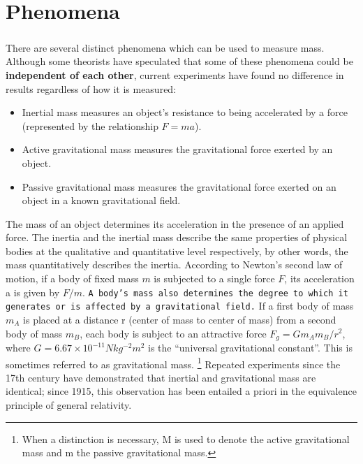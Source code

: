 \documentclass{book}
\begin{document}
	\tableofcontents
	
	
	\chapter{Phenomena}
	\setcounter{page}{1}
	
	\begin{doublespace}
		\paragraph{}
		There are several distinct phenomena which can be used to measure mass. Although some theorists have speculated that some of these phenomena could be \textbf{independent of each other}, current experiments have found no difference in results regardless of how it is measured:
		
		\begin{itemize}
			\item Inertial mass measures an object's resistance to being accelerated by a force (represented by the relationship $F = ma$).
			\item Active gravitational mass measures the gravitational force exerted by an object.
			\item Passive gravitational mass measures the gravitational force exerted on an object in a known gravitational field.
		\end{itemize}    
		
		The mass of an object determines its acceleration in the presence of an applied force. The inertia and the inertial mass describe the same properties of physical bodies at the qualitative and quantitative level respectively, by other words, the mass quantitatively describes the inertia. According to Newton's second law of motion, if a body of fixed mass $m$ is subjected to a single force $F$, its acceleration a is given by $F/m$. \texttt{A body's mass also determines the degree to which it generates or is affected by a gravitational field.} If a first body of mass $m_A$ is placed at a distance r (center of mass to center of mass) from a second body of mass $m_B$, each body is subject to an attractive force $F_g = Gm_Am_B/r^2$, where $G = 6.67 \times 10^{-11} N kg^{-2} m^2$ is the ``universal gravitational constant''. This is sometimes referred to as gravitational mass.  \footnote{When a distinction is necessary, M is used to denote the active gravitational mass and m the passive gravitational mass.} Repeated experiments since the 17th century have demonstrated that inertial and gravitational mass are identical; since 1915, this observation has been entailed a priori in the equivalence principle of general relativity.
	\end{doublespace}
	
\end{document}
